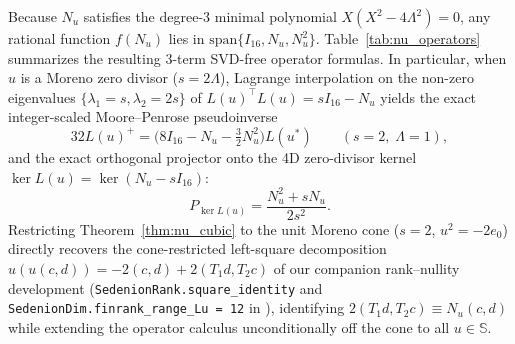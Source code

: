\documentclass[journal,twoside]{IEEEtran}
\theoremstyle{definition}
\theoremstyle{remark}
\newcommand{\Se}{\mathbb{S}}
\begin{document}
Because $N_u$ satisfies the degree-3 minimal polynomial $X(X^2 - 4\Lambda^2) = 0$, any rational function $f(N_u)$ lies in $\mathrm{span}\{I_{16}, N_u, N_u^2\}$. Table~\ref{tab:nu_operators} summarizes the resulting 3-term SVD-free operator formulas. In particular, when $u$ is a Moreno zero divisor ($s = 2\Lambda$), Lagrange interpolation on the non-zero eigenvalues $\{\lambda_1 = s, \lambda_2 = 2s\}$ of $L(u)^\top L(u) = s I_{16} - N_u$ yields the exact integer-scaled Moore--Penrose pseudoinverse
\begin{equation}
    32 L(u)^+ = \bigl(8 I_{16} - N_u - \tfrac{3}{2} N_u^2\bigr) L(u^*) \qquad (s = 2,\; \Lambda = 1),
\end{equation}
and the exact orthogonal projector onto the 4D zero-divisor kernel $\ker L(u) = \ker(N_u - s I_{16})$:
\begin{equation}
    P_{\ker L(u)} = \frac{N_u^2 + s N_u}{2 s^2}.
    \label{eq:p_ker}
\end{equation}
Restricting Theorem~\ref{thm:nu_cubic} to the unit Moreno cone ($s = 2$, $u^2 = -2 e_0$) directly recovers the cone-restricted left-square decomposition $u(u(c,d)) = -2(c,d) + 2(T_1 d, T_2 c)$ of our companion rank--nullity development (\texttt{SedenionRank.square\_identity} and \texttt{SedenionDim.finrank\_range\_Lu = 12} in \cite{Agourakis2026PG32}), identifying $2(T_1 d, T_2 c) \equiv N_u(c,d)$ while extending the operator calculus unconditionally off the cone to all $u \in \Se$.

\end{document}
